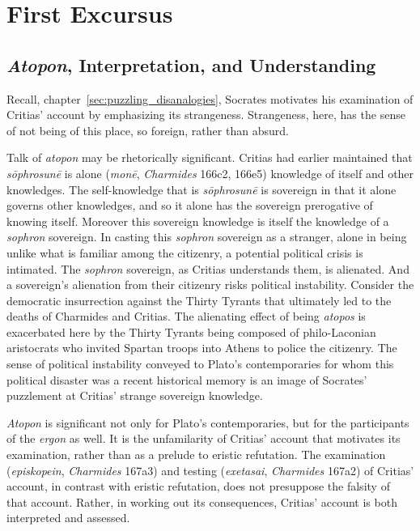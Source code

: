 \chapter{First Excursus} %
\label{cha:first_excursus}


\section{\emph{Atopon}, Interpretation, and Understanding} %
\label{sec:atopos_interpretation_and_understanding}

Recall, chapter~\ref{sec:puzzling_disanalogies}, Socrates motivates his examination of Critias' account by emphasizing its strangeness. Strangeness, here, has the sense of not being of this place, so foreign, rather than absurd.

Talk of \emph{atopon} may be rhetorically significant. Critias had earlier maintained that \emph{sōphrosunē} is alone (\emph{monē}, \emph{Charmides} 166c2, 166e5) knowledge of itself and other knowledges. The self-knowledge that is \emph{sōphrosunē} is sovereign in that it alone governs other knowledges, and so it alone has the sovereign prerogative of knowing itself. Moreover this sovereign knowledge is itself the knowledge of a \emph{sophron} sovereign. In casting this \emph{sophron} sovereign as a stranger, alone in being unlike what is familiar among the citizenry, a potential political crisis is intimated. The \emph{sophron} sovereign, as Critias understands them, is alienated. And a sovereign's alienation from their citizenry risks political instability. Consider the democratic insurrection against the Thirty Tyrants that ultimately led to the deaths of Charmides and Critias. The alienating effect of being \emph{atopos} is exacerbated here by the Thirty Tyrants being composed of philo-Laconian aristocrats who invited Spartan troops into Athens to police the citizenry. The sense of political instability conveyed to Plato's contemporaries for whom this political disaster was a recent historical memory is an image of Socrates' puzzlement at Critias' strange sovereign knowledge.

\emph{Atopon} is significant not only for Plato's contemporaries, but for the participants of the \emph{ergon} as well. It is the unfamilarity of Critias' account that motivates its examination, rather than as a prelude to eristic refutation. The examination (\emph{episkopein}, \emph{Charmides} 167a3) and testing (\emph{exetasai}, \emph{Charmides} 167a2) of Critias' account, in contrast with eristic refutation, does not presuppose the falsity of that account. Rather, in working out its consequences, Critias' account is both interpreted and assessed.

